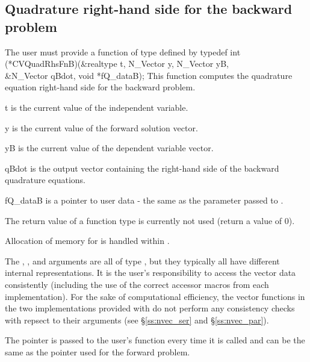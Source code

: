 \subsection{Quadrature right-hand side for the backward problem}
The user must provide a function of type  defined by
{
  typedef int (*CVQuadRhsFnB)(&realtype t, N\_Vector y, N\_Vector yB, \\
                              &N\_Vector qBdot, void *fQ\_dataB);
}
{
  This function computes the quadrature equation right-hand side for the
  backward problem.
}
{
  \begin{args}[fQ\_dataB]
  \item[t]
    is the current value of the independent variable.
  \item[y]
    is the current value of the forward solution vector.
  \item[yB]
    is the current value of the dependent variable vector.
  \item[qBdot]
    is the output vector containing the right-hand side of the backward quadrature
    equations.
  \item[fQ\_dataB]
    is a pointer to user data - the same as the       
    parameter passed to .   
  \end{args}
}
{
  The return value of a  function type is currently not used
  (return a value of 0).
}
{
  Allocation of memory for  is handled within {\cvodes}.

  The , , and  arguments are all of type ,
  but they  typically all have different internal representations. It is the user's 
  responsibility to access the vector data consistently (including the use of the 
  correct accessor macros from each {\nvector} implementation). For the sake of 
  computational efficiency, the vector functions in the two {\nvector} implementations 
  provided with {\cvodes} do not perform any consistency checks with repsect to their 
   arguments (see \S\ref{ss:nvec_ser} and \S\ref{ss:nvec_par}).

  The  pointer is passed to the user's  function every time 
  it is called and can be the same as the  pointer used for the forward problem.
}

